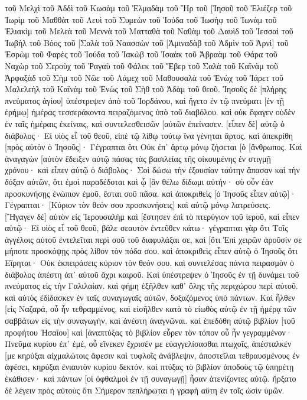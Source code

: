 τοῦ Μελχὶ τοῦ Ἀδδὶ τοῦ Κωσὰμ τοῦ Ἐλμαδὰμ τοῦ Ἢρ 
τοῦ [Ἰησοῦ τοῦ Ἐλιέζερ τοῦ Ἰωρὶμ τοῦ Μαθθὰτ τοῦ Λευὶ 
τοῦ Συμεὼν τοῦ Ἰούδα τοῦ Ἰωσὴφ τοῦ Ἰωνὰμ τοῦ Ἐλιακὶμ 
τοῦ Μελεὰ τοῦ Μεννὰ τοῦ Ματταθὰ τοῦ Ναθὰμ τοῦ Δαυὶδ 
τοῦ Ἰεσσαὶ τοῦ Ἰωβὴλ τοῦ Βόος τοῦ [Σαλὰ τοῦ Ναασσὼν 
τοῦ [Ἀμιναδὰβ τοῦ Ἀδμὶν τοῦ Ἀρνὶ] τοῦ Ἑσρὼμ τοῦ Φαρὲς τοῦ Ἰούδα 
τοῦ Ἰακὼβ τοῦ Ἰσαὰκ τοῦ Ἀβραὰμ τοῦ Θάρα τοῦ Ναχὼρ 
τοῦ Σεροὺχ τοῦ Ῥαγαὺ τοῦ Φάλεκ τοῦ Ἔβερ τοῦ Σαλὰ 
τοῦ Καϊνὰμ τοῦ Ἀρφαξὰδ τοῦ Σὴμ τοῦ Νῶε τοῦ Λάμεχ 
τοῦ Μαθουσαλὰ τοῦ Ἑνὼχ τοῦ Ἰάρετ τοῦ Μαλελεὴλ τοῦ Καϊνὰμ 
τοῦ Ἐνὼς τοῦ Σὴθ τοῦ Ἀδὰμ τοῦ θεοῦ. 
Ἰησοῦς δὲ [πλήρης πνεύματος ἁγίου] ὑπέστρεψεν ἀπὸ τοῦ Ἰορδάνου, καὶ ἤγετο ἐν τῷ πνεύματι [ἐν τῇ ἐρήμῳ] 
ἡμέρας τεσσεράκοντα πειραζόμενος ὑπὸ τοῦ διαβόλου. καὶ οὐκ ἔφαγεν οὐδὲν ἐν ταῖς ἡμέραις ἐκείναις, καὶ συντελεσθεισῶν [αὐτῶν ἐπείνασεν. 
[εἶπεν δὲ] αὐτῷ ὁ διάβολος· Εἰ υἱὸς εἶ τοῦ θεοῦ, εἰπὲ τῷ λίθῳ τούτῳ ἵνα γένηται ἄρτος. 
καὶ ἀπεκρίθη [πρὸς αὐτὸν ὁ Ἰησοῦς]· Γέγραπται ὅτι Οὐκ ἐπ᾽ ἄρτῳ μόνῳ ζήσεται [ὁ [ἄνθρωπος. 
Καὶ ἀναγαγὼν [αὐτὸν ἔδειξεν αὐτῷ πάσας τὰς βασιλείας τῆς οἰκουμένης ἐν στιγμῇ χρόνου· 
καὶ εἶπεν αὐτῷ ὁ διάβολος· Σοὶ δώσω τὴν ἐξουσίαν ταύτην ἅπασαν καὶ τὴν δόξαν αὐτῶν, ὅτι ἐμοὶ παραδέδοται καὶ ᾧ [ἂν θέλω δίδωμι αὐτήν· 
σὺ οὖν ἐὰν προσκυνήσῃς ἐνώπιον ἐμοῦ, ἔσται σοῦ πᾶσα. 
καὶ ἀποκριθεὶς [ὁ Ἰησοῦς εἶπεν αὐτῷ]· Γέγραπται· [Κύριον τὸν θεόν σου προσκυνήσεις] καὶ αὐτῷ μόνῳ λατρεύσεις. 
[Ἤγαγεν δὲ] αὐτὸν εἰς Ἰερουσαλὴμ καὶ [ἔστησεν ἐπὶ τὸ πτερύγιον τοῦ ἱεροῦ, καὶ εἶπεν αὐτῷ· Εἰ υἱὸς εἶ τοῦ θεοῦ, βάλε σεαυτὸν ἐντεῦθεν κάτω· 
γέγραπται γὰρ ὅτι Τοῖς ἀγγέλοις αὐτοῦ ἐντελεῖται περὶ σοῦ τοῦ διαφυλάξαι σε, 
καὶ [ὅτι Ἐπὶ χειρῶν ἀροῦσίν σε μήποτε προσκόψῃς πρὸς λίθον τὸν πόδα σου. 
καὶ ἀποκριθεὶς εἶπεν αὐτῷ ὁ Ἰησοῦς ὅτι Εἴρηται· Οὐκ ἐκπειράσεις κύριον τὸν θεόν σου. 
καὶ συντελέσας πάντα πειρασμὸν ὁ διάβολος ἀπέστη ἀπ᾽ αὐτοῦ ἄχρι καιροῦ. 
Καὶ ὑπέστρεψεν ὁ Ἰησοῦς ἐν τῇ δυνάμει τοῦ πνεύματος εἰς τὴν Γαλιλαίαν. καὶ φήμη ἐξῆλθεν καθ᾽ ὅλης τῆς περιχώρου περὶ αὐτοῦ. 
καὶ αὐτὸς ἐδίδασκεν ἐν ταῖς συναγωγαῖς αὐτῶν, δοξαζόμενος ὑπὸ πάντων. 
Καὶ ἦλθεν [εἰς Ναζαρά, οὗ ἦν τεθραμμένος, καὶ εἰσῆλθεν κατὰ τὸ εἰωθὸς αὐτῷ ἐν τῇ ἡμέρᾳ τῶν σαββάτων εἰς τὴν συναγωγήν, καὶ ἀνέστη ἀναγνῶναι. 
καὶ ἐπεδόθη αὐτῷ βιβλίον [τοῦ προφήτου Ἠσαΐου] καὶ [ἀναπτύξας τὸ βιβλίον εὗρεν τὸν τόπον οὗ ἦν γεγραμμένον· 
Πνεῦμα κυρίου ἐπ᾽ ἐμέ, οὗ εἵνεκεν ἔχρισέν με εὐαγγελίσασθαι πτωχοῖς, ἀπέσταλκέν [με κηρύξαι αἰχμαλώτοις ἄφεσιν καὶ τυφλοῖς ἀνάβλεψιν, ἀποστεῖλαι τεθραυσμένους ἐν ἀφέσει, 
κηρύξαι ἐνιαυτὸν κυρίου δεκτόν. 
καὶ πτύξας τὸ βιβλίον ἀποδοὺς τῷ ὑπηρέτῃ ἐκάθισεν· καὶ πάντων [οἱ ὀφθαλμοὶ ἐν τῇ συναγωγῇ] ἦσαν ἀτενίζοντες αὐτῷ. 
ἤρξατο δὲ λέγειν πρὸς αὐτοὺς ὅτι Σήμερον πεπλήρωται ἡ γραφὴ αὕτη ἐν τοῖς ὠσὶν ὑμῶν. 
